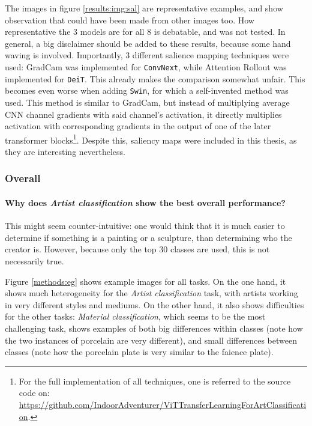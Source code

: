 The images in figure \ref{results:img:sal} are representative examples, and show observation that could have been made from other images too. How representative the 3 models are for all 8 is debatable, and was not tested. In general, a big disclaimer should be added to these results, because some hand waving is involved. Importantly, 3 different salience mapping techniques were used: GradCam \citep{selvaraju2017grad} was implemented for \texttt{ConvNext}, while Attention Rollout \citep{abnar2020quantifying} was implemented for \texttt{DeiT}. This already makes the comparison somewhat unfair. This becomes even worse when adding \texttt{Swin}, for which a self-invented method was used. This method is similar to GradCam, but instead of multiplying average CNN channel gradients with said channel's activation, it directly multiplies activation with corresponding gradients in the output of one of the later transformer blocks\footnote{For the full implementation of all techniques, one is referred to the source code on: \\ \url{https://github.com/IndoorAdventurer/ViTTransferLearningForArtClassification}.}. Despite this, saliency maps were included in this thesis, as they are interesting nevertheless.

\subsubsection{Overall}

\paragraph{Why does \textit{Artist classification} show the best overall performance?}
This might seem counter-intuitive: one would think that it is much easier to determine if something is a painting or a sculpture, than determining who the creator is. However, because only the top 30 classes are used, this is not necessarily true.

Figure \ref{methods:eg} shows example images for all tasks. On the one hand, it shows much heterogeneity for the \textit{Artist classification} task, with artists working in very different styles and mediums. On the other hand, it also shows difficulties for the other tasks: \textit{Material classification}, which seems to be the most challenging task, shows examples of both big differences within classes (note how the two instances of porcelain are very different), and small differences between classes (note how the porcelain plate is very similar to the faience plate).

